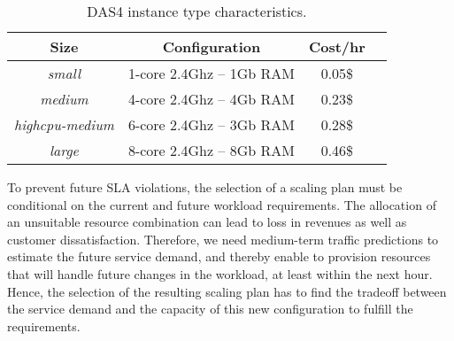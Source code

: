 \begin{table}[t]
  {\scriptsize 
\begin{center}
    \begin{tabular}{  | c | c | c | c | }
    \hline
       \textbf{Size}  & \textbf{Configuration} & \textbf{Cost/hr} \\ \hline
   \textit{small}   & 1-core 2.4Ghz -- 1Gb RAM&  0.05\$ \\ \hline
   \textit{medium}   & 4-core 2.4Ghz  -- 4Gb RAM&  0.23\$ \\ \hline
\textit{highcpu-medium} & 6-core 2.4Ghz -- 3Gb RAM& 0.28\$   \\ \hline
\textit{large} & 8-core 2.4Ghz  -- 8Gb RAM& 0.46\$   \\ \hline

 \end{tabular}
\end{center}
\caption{DAS4 instance type characteristics.}
\label{DAS4instances}
}
\end{table}

To prevent future SLA violations, the selection of a scaling plan must be conditional on the current and future workload requirements. The allocation of an unsuitable resource combination can lead to loss in revenues as well as customer dissatisfaction. Therefore, we need medium-term traffic predictions to estimate the future service demand, and thereby enable to provision resources that will handle future changes in the workload, at least within the next hour. Hence, the selection of the resulting scaling plan has to find the tradeoff between the service demand and the capacity of this new configuration to fulfill the requirements. 



